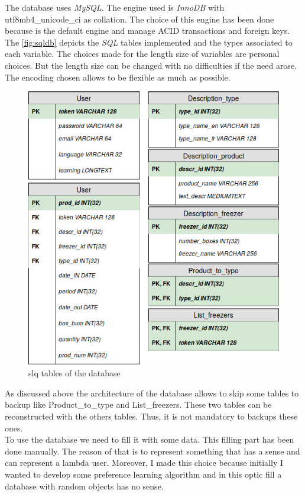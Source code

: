 The database uses \textit{MySQL}. The engine used is \textit{InnoDB} with utf8mb4\_unicode\_ci as collation. The choice of this engine has been done because is the default engine and manage ACID transactions and foreign keys. The \autoref{fig:sqldb} depicts the \textit{SQL} tables implemented and the types associated to each variable. The choices made for the length size of variables are personal choices. But the length size can be changed with no difficulties if the need arose. The encoding chosen allows to be flexible as much as possible.

\begin{figure}[H]
\centering
\includegraphics[scale=0.5]{./images/sqldb.jpg}
\caption{slq tables of the database}
\label{fig:sqldb}
\end{figure}

As discussed above the architecture of the database allows to skip some tables to backup like Product\_to\_type and List\_freezers. These two tables can be reconstructed with the others tables. Thus, it is not mandatory to backups these ones.\\

To use the database we need to fill it with some data. This filling part has been done manually. The reason of that is to represent something that has a sense and can represent a lambda user. Moreover, I made this choice because initially I wanted to develop some preference learning algorithm and in this optic fill a database with random objects has no sense. 

